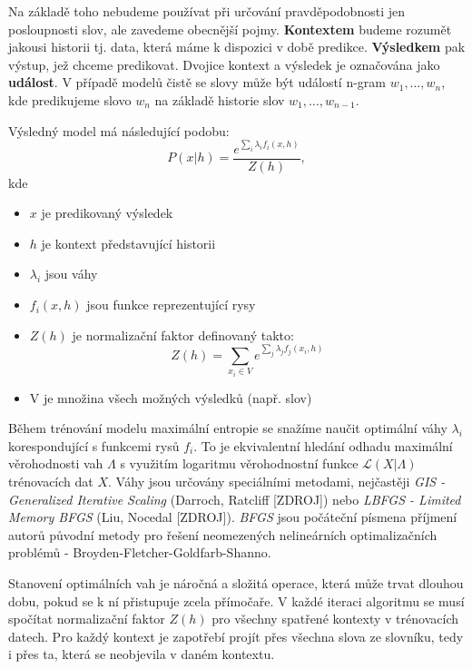 \documentclass[12pt,a4paper]{report}
\begin{document}
Na základě toho nebudeme používat při určování pravděpodobnosti jen posloupnosti slov, ale zavedeme obecnější pojmy. \textbf{Kontextem} budeme rozumět jakousi historii tj. data, která máme k dispozici v době predikce. \textbf{Výsledkem} pak výstup, jež chceme predikovat. Dvojice kontext a výsledek je označována jako \textbf{událost}. V případě modelů čistě se slovy může být událostí n-gram $w_1, \ldots, w_n$, kde predikujeme slovo $w_n$ na základě historie slov $w_1, \ldots, w_{n-1}$.

Výsledný model má následující podobu:
\begin{equation}
P(x|h) = \frac{e^{\sum_i \lambda_i f_i(x,h)}}{Z(h)},
\end{equation}
kde \begin{itemize} 
\item{$x$ je predikovaný výsledek}
\item{$h$ je kontext představující historii}
\item{$\lambda_i$ jsou váhy}
\item{$f_i(x,h)$ jsou funkce reprezentující rysy}
\item{$Z(h)$ je normalizační faktor definovaný takto:
\begin{equation}
Z(h) = \sum_{x_i \in V} e^{\sum_j \lambda_j f_j(x_i,h)}
\end{equation} }
\item{V je množina všech možných výsledků (např. slov)}
\end{itemize}

Během trénování modelu maximální entropie se snažíme naučit optimální váhy $\lambda_i$ korespondující s funkcemi rysů $f_i$. To je ekvivalentní hledání odhadu maximální věrohodnosti vah $\Lambda$ s využitím logaritmu věrohodnostní funkce $\mathcal{L}(X|\Lambda)$ trénovacích dat $X$. Váhy jsou určovány speciálními metodami, nejčastěji \textit{GIS - Generalized Iterative Scaling} (Darroch, Ratcliff [ZDROJ]) nebo \textit{LBFGS - Limited Memory BFGS} (Liu, Nocedal [ZDROJ]). \textit{BFGS} jsou počáteční písmena příjmení autorů původní metody pro řešení neomezených nelineárních optimalizačních problémů - Broyden-Fletcher-Goldfarb-Shanno.

Stanovení optimálních vah je náročná a složitá operace, která může trvat dlouhou dobu, pokud se k ní přistupuje zcela přímočaře. V každé iteraci algoritmu se musí spočítat normalizační faktor $Z(h)$ pro všechny spatřené kontexty v trénovacích datech. Pro každý kontext je zapotřebí projít přes všechna slova ze slovníku, tedy i přes ta, která se neobjevila v daném kontextu.
\end{document}

